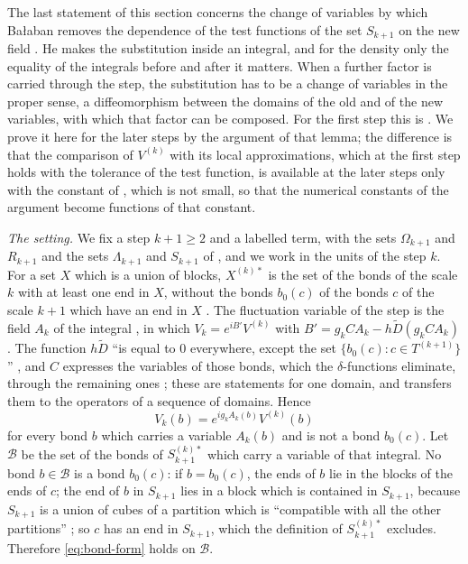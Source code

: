\documentclass[11pt]{preprint}
\numberwithin{equation}{section}
\theoremstyle{definition}
\theoremstyle{remark}
\theoremstyle{plain}
\begin{document}
The last statement of this section concerns the change of variables by which Ba{\l}aban removes the dependence of the test functions of the set $S_{k+1}$ on the new field \cite[p.~269]{BalabanCRE}. He makes the substitution inside an integral, and for the density only the equality of the integrals before and after it matters. When a further factor is carried through the step, the substitution has to be a change of variables in the proper sense, a diffeomorphism between the domains of the old and of the new variables, with which that factor can be composed. For the first step this is \cite[Lemma~3.8]{WilsonFirstStep}. We prove it here for the later steps by the argument of that lemma; the difference is that the comparison of $V^{(k)}$ with its local approximations, which at the first step holds with the tolerance of the test function, is available at the later steps only with the constant of \cite[(3.13), p.~267]{BalabanCRE}, which is not small, so that the numerical constants of the argument become functions of that constant.

\emph{The setting.} We fix a step $k + 1 \geq 2$ and a labelled term, with the sets $\Omega_{k+1}$ and $R_{k+1}$ and the sets $\Lambda_{k+1}$ and $S_{k+1}$ of \cite[(3.20), p.~269]{BalabanCRE}, and we work in the units of the step $k$. For a set $X$ which is a union of blocks, $X^{(k)*}$ is the set of the bonds of the scale $k$ with at least one end in $X$, without the bonds $b_0(c)$ of the bonds $c$ of the scale $k + 1$ which have an end in $X$ \cite[p.~247]{BalabanCRE}. The fluctuation variable of the step is the field $A_k$ of the integral \cite[(3.15), pp.~267--268]{BalabanCRE}, in which $V_k = e^{iB'}V^{(k)}$ with $B' = g_kCA_k - h\tilde D(g_kCA_k)$. The function $h\tilde D$ ``is equal to $0$ everywhere, except the set $\{ b_0(c) : c \in T^{(k+1)} \}$'' \cite[p.~267]{BalabanRG1}, and $C$ expresses the variables of those bonds, which the $\delta$-functions eliminate, through the remaining ones \cite[p.~268]{BalabanRG1}; these are statements for one domain, and \cite[p.~267]{BalabanCRE} transfers them to the operators of a sequence of domains. Hence
\begin{equation}\label{eq:bond-form}
    V_k(b) = e^{ig_kA_k(b)}V^{(k)}(b)
\end{equation}
for every bond $b$ which carries a variable $A_k(b)$ and is not a bond $b_0(c)$. Let $\mathcal B$ be the set of the bonds of $S_{k+1}^{(k)*}$ which carry a variable of that integral. No bond $b \in \mathcal B$ is a bond $b_0(c)$: if $b = b_0(c)$, the ends of $b$ lie in the blocks of the ends of $c$; the end of $b$ in $S_{k+1}$ lies in a block which is contained in $S_{k+1}$, because $S_{k+1}$ is a union of cubes of a partition which is ``compatible with all the other partitions'' \cite[p.~265]{BalabanCRE}; so $c$ has an end in $S_{k+1}$, which the definition of $S_{k+1}^{(k)*}$ excludes. Therefore \eqref{eq:bond-form} holds on $\mathcal B$.
\end{document}
